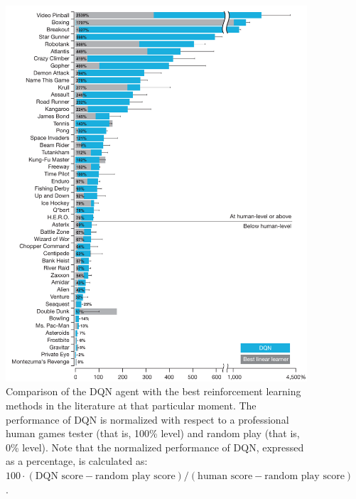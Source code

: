 \documentclass{article}
\begin{document}
\pagebreak

\begin{figure}[t]
	\centering
	\includegraphics[width=13cm]{games.png}		
	\caption{Comparison of the DQN agent with the best reinforcement
learning methods in the literature at that particular moment. The performance of DQN is normalized
with respect to a professional human games tester (that is, 100\% level) and
random play (that is, 0\% level). Note that the normalized performance of DQN,
expressed as a percentage, is calculated as: $100 \cdot (\text{DQN score} - \text{random play
score}) / (\text{human score} - \text{random play score})$. \label{games}}
\end{figure}
\noindent


\nocite{*}

\end{document}
